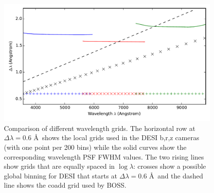 \documentclass[12pt]{article}
\begin{document}
\begin{figure}[htb]
\begin{center}
\includegraphics[width=5in]{fig/grids}
\caption{Comparison of different wavelength grids. The horizontal row at $\Delta\lambda = 0.6$ \AA\ shows the local grids used in the DESI b,r,z cameras (with one point per 200 bins) while the solid curves show the corresponding wavelength PSF FWHM values. The two rising lines show grids that are equally spaced in $\log\lambda$: crosses show a possible global binning for DESI that starts at $\Delta\lambda = 0.6$ \AA\ and the dashed line shows the coadd grid used by BOSS.}
\label{fig:grids}
\end{center}
\end{figure}

\def\apjl{ApJL} %
\def\aj{AJ} %
\def\apj{ApJ} %
\def\pasp{PASP} %
\def\spie{SPIE} %
\def\apjs{ApJS} %
\def\araa{ARAA} %
\def\aap{A\&A} %
\def\aaps{A\&A~Supl.} %
\def\nat{Nature} %
\def\nar{New Astron. Rev.} %
\def\mnras{MNRAS} %
\def\jcap{JCAP} %
\def\prd{{Phys.~Rev.~D}}        %
\def\physrep{{Phys.~Reports}} %



\end{document}
